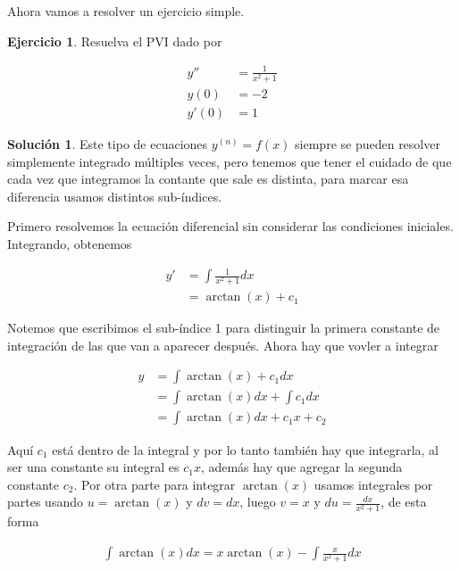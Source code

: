 \documentclass{article}
\theoremstyle{plain}
\theoremstyle{definition}
\newtheorem{ejer}[thm]{Ejercicio}
\newtheorem{sol}[thm]{Solución}
\begin{document}
Ahora vamos a resolver un ejercicio simple. \\


\begin{ejer}Resuelva el PVI dado por
\end{ejer}

\begin{align*}
    y'' &= \frac{1}{x^2+1} \\
    y\left( 0\right) &=-2 \\
    y'\left( 0\right) &= 1
\end{align*}

\begin{sol}Este tipo de ecuaciones $y^{(n)} = f(x)$ siempre se pueden resolver simplemente integrado múltiples veces, pero tenemos que tener el cuidado de que cada vez que integramos la contante que sale es distinta, para marcar esa diferencia usamos distintos sub-índices.
\end{sol}

\newpage

Primero resolvemos la ecuación diferencial sin considerar las condiciones iniciales. Integrando, obtenemos

\begin{align*}
    y' &= \int \frac{1}{x^2+1} dx \\
       &= \arctan(x) +c_1
\end{align*}

Notemos que escribimos el sub-índice 1 para distinguir la primera constante de integración de las que van a aparecer después. Ahora hay que vovler a integrar


\begin{align*}
    y  &= \int \arctan(x) +c_1 dx \\
       &= \int \arctan(x)dx + \int c_1 dx \\
       &= \int \arctan(x)dx + c_1x +c_2
\end{align*}

Aquí $c_1$ está dentro de la integral y por lo tanto también hay que integrarla, al ser una constante su integral es $c_1x$, además hay que agregar la segunda constante $c_2$. Por otra parte para integrar $\arctan(x)$ usamos integrales por partes usando $u=\arctan(x)$ y $dv=dx$, luego $v=x$ y $du = \frac{dx}{x^2+1}$, de esta forma

\begin{align*}
   \int \arctan(x) dx = x\arctan(x) - \int \frac{x}{x^2+1} dx
\end{align*}
\end{document}
